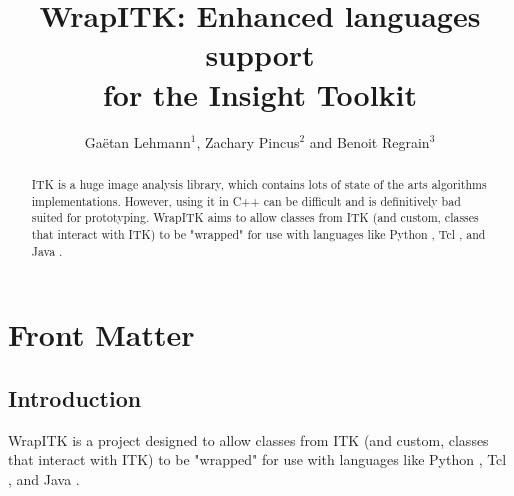 \documentclass{InsightArticle}
\title{WrapITK: Enhanced languages support\\ for the Insight Toolkit}
\author{Ga\"etan Lehmann{$^1$}{\small{,}} Zachary Pincus{$^2$} {\small{and}} Benoit Regrain{$^3$}}
\begin{document}
\lstset{language=python}
\maketitle

\ifhtml
\chapter*{Front Matter\label{front}}
\fi


\begin{abstract}
\noindent
ITK \cite{ITKWebSite} is a huge image analysis library, which contains lots of state of the arts
algorithms implementations. However, using it in C++ can be difficult and is
definitively bad suited for prototyping. WrapITK aims to allow classes from ITK
(and custom, classes that interact with ITK) to be "wrapped" for use with
languages like Python \cite{PythonWebSite}, Tcl \cite{TclWebSite}, and Java \cite{JavaWebSite}.
\end{abstract}

\tableofcontents

\section{Introduction}

WrapITK is a project designed to allow classes from ITK (and custom, classes
that interact with ITK) to be "wrapped" for use with languages like
Python \cite{PythonWebSite}, Tcl \cite{TclWebSite}, and Java \cite{JavaWebSite}.
\end{document}
